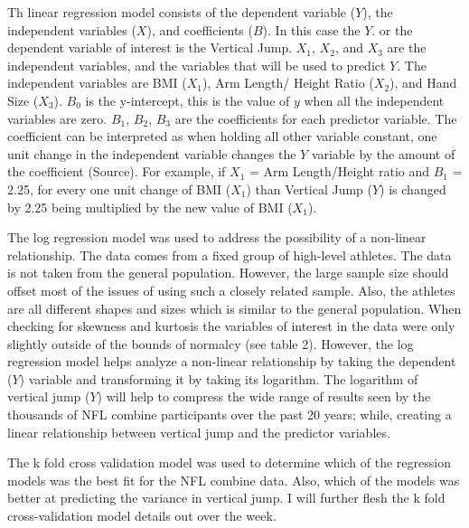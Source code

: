 \documentclass[12pt]{article}
\begin{document}
Th linear regression model consists of the dependent variable ($Y$), the independent variables ($X$), and coefficients ($B$). In this case the $Y$. or the dependent variable of interest is the Vertical Jump. $X_1$, $X_2$, and $X_3$ are the independent variables, and the variables that will be used to predict $Y$. The independent variables are BMI ($X_1$), Arm Length/ Height Ratio ($X_2$), and Hand Size ($X_3$). $B_0$ is the y-intercept, this is the value of $y$ when all the independent variables are zero. $B_1$, $B_2$, $B_3$ are the coefficients for each predictor variable. The coefficient can be interpreted as when holding all other variable constant, one unit change in the independent variable changes the $Y$ variable by the amount of the coefficient (Source). For example, if $X_1$ = Arm Length/Height ratio and $B_1$ = 2.25, for every one unit change of BMI ($X_1$) than Vertical Jump ($Y$) is changed by 2.25 being multiplied by the new value of BMI ($X_1$).

The log regression model was used to address the possibility of a non-linear relationship. The data comes from a fixed group of high-level athletes. The data is not taken from the general population. However, the large sample size should offset most of the issues of using such a closely related sample. Also, the athletes are all different shapes and sizes which is similar to the general population. When checking for skewness and kurtosis the variables of interest in the data were only slightly outside of the bounds of normalcy (see table 2). However, the log regression model helps analyze a non-linear relationship by taking the dependent ($Y$) variable and transforming it by taking its logarithm. The logarithm of vertical jump ($Y$) will help to compress the wide range of results seen by the thousands of NFL combine participants over the past 20 years; while, creating a linear relationship between vertical jump and the predictor variables.

The k fold cross validation model was used to determine which of the regression models was the best fit for the NFL combine data. Also, which of the models was better at predicting the variance in vertical jump. I will further flesh the k fold cross-validation model details out over the week.
\end{document}
